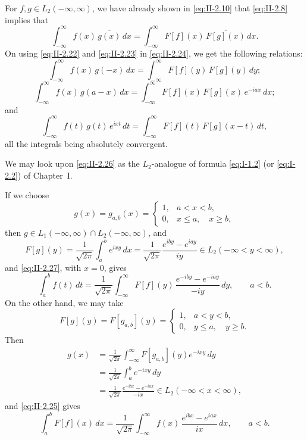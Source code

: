 For $f,g\in L_{2}(-\infty,\infty)$, we have already shown in \eqref{eq:II-2.10} that \eqref{eq:II-2.8} implies that
\begin{equation}\tag{2.24}\label{eq:II-2.24}
\int_{-\infty}^{\infty}f(x)\,\overline{g(x)}\,dx
=\int_{-\infty}^{\infty}F[f](x)\,\overline{F[g](x)}\,dx.
\end{equation}
On using \eqref{eq:II-2.22} and \eqref{eq:II-2.23} in \eqref{eq:II-2.24}, we get the following relations:
\begin{equation}\tag{2.25}\label{eq:II-2.25}
\int_{-\infty}^{\infty}f(x)\,g(-x)\,dx
=\int_{-\infty}^{\infty}F[f](y)\,F[g](y)\,dy;
\end{equation}
\begin{equation}\tag{2.26}\label{eq:II-2.26}
\int_{-\infty}^{\infty}f(x)\,g(a-x)\,dx
=\int_{-\infty}^{\infty}F[f](x)\,F[g](x)\,e^{-iax}\,dx;
\end{equation}
and
\begin{equation}\tag{2.27}\label{eq:II-2.27}
\int_{-\infty}^{\infty}f(t)\,g(t)\,e^{ixt}\,dt
=\int_{-\infty}^{\infty}F[f](t)\,F[g](x-t)\,dt,
\end{equation}
all the integrals being absolutely convergent.

We may look upon \eqref{eq:II-2.26} as the $L_{2}$-analogue of formula \eqref{eq:I-1.2} (or \eqref{eq:I-2.2}) of Chapter~I.

If we choose
\[
g(x)=g_{a,b}(x)=
\begin{cases}
1, & a<x<b,\\
0, & x\le a,\quad x\ge b,
\end{cases}
\]
then $g\in L_{1}(-\infty,\infty)\cap L_{2}(-\infty,\infty)$, and
\[
F[g](y)=\frac{1}{\sqrt{2\pi}}\int_{a}^{b}e^{ixy}\,dx
=\frac{1}{\sqrt{2\pi}}\frac{e^{iby}-e^{iay}}{iy}\in L_{2}(-\infty<y<\infty),
\]
and \eqref{eq:II-2.27}, with $x=0$, gives
\begin{equation}\tag{2.28}\label{eq:II-2.28}
\int_{a}^{b}f(t)\,dt
=\frac{1}{\sqrt{2\pi}}\int_{-\infty}^{\infty}F[f](y)\,\frac{e^{-iby}-e^{-iay}}{-iy}\,dy,\qquad a<b.
\end{equation}
On the other hand, we may take
\[
F[g](y)=F[g_{a,b}](y)=
\begin{cases}
1, & a<y<b,\\
0, & y\le a,\quad y\ge b.
\end{cases}
\]
Then
\[
\begin{aligned}
g(x) &= \frac{1}{\sqrt{2\pi}}\int_{-\infty}^{\infty}F[g_{a,b}](y)e^{-ixy}\,dy\\
&= \frac{1}{\sqrt{2\pi}}\int_{a}^{b}e^{-ixy}\,dy\\
&= \frac{1}{\sqrt{2\pi}}\frac{e^{-ibx}-e^{-iax}}{-ix}\in L_{2}(-\infty<x<\infty),
\end{aligned}
\]
and \eqref{eq:II-2.25} gives
\begin{equation}\tag{2.29}\label{eq:II-2.29}
\int_{a}^{b}F[f](x)\,dx
=\frac{1}{\sqrt{2\pi}}\int_{-\infty}^{\infty}f(x)\,\frac{e^{ibx}-e^{iax}}{ix}\,dx,\qquad a<b.
\end{equation}

